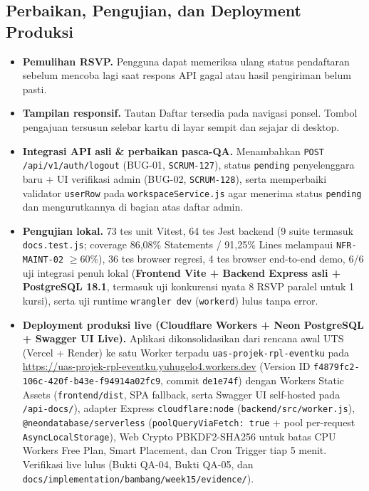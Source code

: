\documentclass[11pt,a4paper]{article}
\begin{document}
\subsection*{Perbaikan, Pengujian, dan Deployment Produksi}
\begin{itemize}
\item \textbf{Pemulihan RSVP.} Pengguna dapat memeriksa ulang status pendaftaran sebelum mencoba lagi saat respons API gagal atau hasil pengiriman belum pasti.
\item \textbf{Tampilan responsif.} Tautan Daftar tersedia pada navigasi ponsel. Tombol pengajuan tersusun selebar kartu di layar sempit dan sejajar di desktop.
\item \textbf{Integrasi API asli \& perbaikan pasca-QA.} Menambahkan \texttt{POST /api/v1/auth/logout} (BUG-01, \texttt{SCRUM-127}), status \texttt{pending} penyelenggara baru + UI verifikasi admin (BUG-02, \texttt{SCRUM-128}), serta memperbaiki validator \texttt{userRow} pada \texttt{workspaceService.js} agar menerima status \texttt{pending} dan mengurutkannya di bagian atas daftar admin.
\item \textbf{Pengujian lokal.} 73 tes unit Vitest, 64 tes Jest backend (9 suite termasuk \texttt{docs.test.js}; coverage 86,08\% Statements / 91,25\% Lines melampaui \texttt{NFR-MAINT-02} $\ge 60\%$), 36 tes browser regresi, 4 tes browser end-to-end demo, 6/6 uji integrasi penuh lokal (\textbf{Frontend Vite + Backend Express asli + PostgreSQL 18.1}, termasuk uji konkurensi nyata 8 RSVP paralel untuk 1 kursi), serta uji runtime \texttt{wrangler dev} (\texttt{workerd}) lulus tanpa error.
\item \textbf{Deployment produksi live (Cloudflare Workers + Neon PostgreSQL + Swagger UI Live).} Aplikasi dikonsolidasikan dari rencana awal UTS (Vercel + Render) ke satu Worker terpadu \texttt{uas-projek-rpl-eventku} pada \url{https://uas-projek-rpl-eventku.yuhugelo4.workers.dev} (Version ID \texttt{f4879fc2-106c-420f-b43e-f94914a02fc9}, commit \texttt{de1e74f}) dengan Workers Static Assets (\texttt{frontend/dist}, SPA fallback, serta Swagger UI self-hosted pada \texttt{/api-docs/}), adapter Express \texttt{cloudflare:node} (\texttt{backend/src/worker.js}), \texttt{@neondatabase/serverless} (\texttt{poolQueryViaFetch: true} + pool per-request \texttt{AsyncLocalStorage}), Web Crypto PBKDF2-SHA256 untuk batas CPU Workers Free Plan, Smart Placement, dan Cron Trigger tiap 5 menit. Verifikasi live lulus (Bukti QA-04, Bukti QA-05, dan \texttt{docs/implementation/bambang/week15/evidence/}).
\end{itemize}
\end{document}
